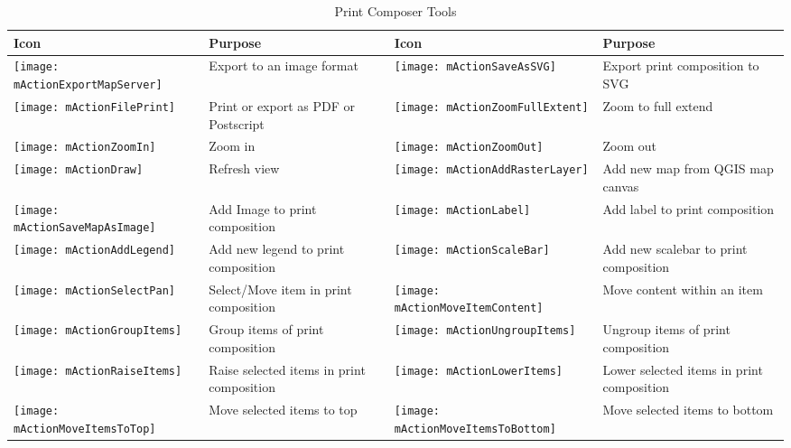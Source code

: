 \begin{table}[h]
\centering
\caption{Print Composer Tools}\label{tab:printcomposer_tools}\medskip
 \begin{tabular}{|l|p{6.9cm}|l|p{6.9cm}|}
 \hline \textbf{Icon} & \textbf{Purpose} & \textbf{Icon} &
 \textbf{Purpose} \\

 \hline \texttt{[image: mActionExportMapServer]}
 & Export to an image format & 
 \texttt{[image: mActionSaveAsSVG]} & Export print composition 
 to SVG \\
 \hline \texttt{[image: mActionFilePrint]} & Print or 
 export as PDF or Postscript &
 \texttt{[image: mActionZoomFullExtent]} & Zoom to
 full extend \\
 \hline \texttt{[image: mActionZoomIn]} & Zoom in &
 \texttt{[image: mActionZoomOut]} & Zoom out \\
 \hline \texttt{[image: mActionDraw]} & Refresh 
 view &
 \texttt{[image: mActionAddRasterLayer]} & Add 
 new map from QGIS map canvas \\
 \hline \texttt{[image: mActionSaveMapAsImage]} & Add Image to 
 print composition &
 \texttt{[image: mActionLabel]} & Add label to print composition \\
 \hline \texttt{[image: mActionAddLegend]} & Add new legend to 
 print composition & 
 \texttt{[image: mActionScaleBar]} & Add new scalebar to print
 composition\\
 \hline \texttt{[image: mActionSelectPan]} & Select/Move item in 
 print composition &
 \texttt{[image: mActionMoveItemContent]} & Move content within
 an item \\
 \hline \texttt{[image: mActionGroupItems]} & Group items of 
 print composition & 
 \texttt{[image: mActionUngroupItems]} & Ungroup items of print 
 composition \\
 \hline \texttt{[image: mActionRaiseItems]} & Raise selected
 items in print composition &
 \texttt{[image: mActionLowerItems]} & Lower selected items 
 in print composition \\
 \hline \texttt{[image: mActionMoveItemsToTop]} & Move selected
 items to top & 
 \texttt{[image: mActionMoveItemsToBottom]} & Move selected
 items to bottom \\
\hline
\end{tabular}
\end{table}

